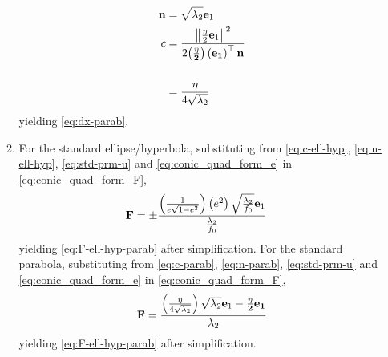 \documentclass[journal,12pt,onecolumn]{IEEEtran}
\renewcommand\thesection{\arabic{section}}
\begin{document}
\begin{enumerate}[label=\thesection.\arabic*.,ref=\thesection.\theenumi]
\begin{enumerate}
				\begin{align}
\label{eq:n-parab}
					\mathbf{n} &= \sqrt{\lambda_2} \mathbf{e}_1 
					\\
					c &=
	\frac{\left\lVert\frac{\eta}{2} \mathbf{e}_1\right\rVert^2   }{2\mathbf{\left(\frac{\eta}{2}\right) \left(\mathbf{e}_1\right)^{\top}\mathbf{n}}} 
\\
					\\
					&= \frac{\eta}{4\sqrt{\lambda_2}}
\label{eq:c-parab}
				\end{align}
				yielding 
					\eqref{eq:dx-parab}.

				\item 	For the standard ellipse/hyperbola, substituting from
\eqref{eq:c-ell-hyp},
\eqref{eq:n-ell-hyp},
\eqref{eq:std-prm-u}
and \eqref{eq:conic_quad_form_e}
in \eqref{eq:conic_quad_form_F},
				\begin{align}
					\mathbf{F} &= \pm \frac{\left(\frac{1}{e\sqrt{1-e^2}}\right)\left(e^2\right)\sqrt{\frac{\lambda_2}{f_0}}\mathbf{e}_1}{\frac{\lambda_2}{f_0}}
 			\end{align}
			yielding
					\eqref{eq:F-ell-hyp-parab}
					after simplification.
					For the standard parabola, substituting from 
\eqref{eq:c-parab},
\eqref{eq:n-parab},
\eqref{eq:std-prm-u}
and \eqref{eq:conic_quad_form_e}
in \eqref{eq:conic_quad_form_F},			
				\begin{align}
	\mathbf{F}  &= \frac{\left(\frac{\eta}{4\sqrt{\lambda_2}}\right)\sqrt{\lambda_2}\mathbf{e}_1-\mathbf{\frac{\eta}{2} \mathbf{e}_1}}{\lambda_2}
\\
				\end{align}
				yielding 
					\eqref{eq:F-ell-hyp-parab} after simplification.

		\end{enumerate}

\end{enumerate}
\end{document}
